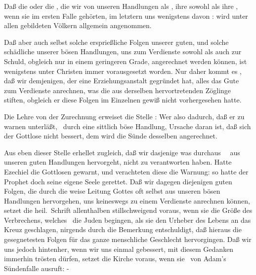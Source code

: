 \begin{aufza}
\item Daß die  oder die , die wir von unseren Handlungen als , ihre  sowohl als ihre , wenn sie im ersten Falle  gehörten, im letztern uns wenigstens davon : wird unter allen gebildeten Völkern allgemein angenommen.
\item Daß aber auch selbst solche ersprießliche Folgen unserer guten, und solche schädliche unserer bösen Handlungen,  uns zum Verdienste sowohl als auch zur Schuld, obgleich nur in einem geringeren Grade, angerechnet werden können, ist wenigstens unter Christen immer vorausgesetzt worden. Nur daher kommt es \zB , daß wir demjenigen, der eine Erziehungsanstalt gegründet hat, alles das Gute zum Verdienste anrechnen, was die aus derselben hervortretenden Zöglinge stiften, obgleich er diese Folgen im Einzelnen gewiß nicht vorhergesehen hatte.
\item Die Lehre von der Zurechnung  erweiset die Stelle :  Wer also dadurch, daß er zu warnen unterläßt, \dh\ durch eine sittlich böse Handlung, Ursache daran ist, daß sich der Gottlose nicht bessert, dem wird die Sünde desselben angerechnet.
\item Aus eben dieser Stelle erhellet zugleich, daß wir dasjenige  was durchaus ~\ aus unseren guten Handlungen hervorgeht, nicht zu verantworten haben. Hatte Ezechiel die Gottlosen gewarnt, und verachteten diese die Warnung: so hatte der Prophet doch seine eigene Seele gerettet. Daß wir dagegen diejenigen guten Folgen, die durch die weise Leitung Gottes oft selbst aus unseren bösen Handlungen hervorgehen, uns keineswegs zu einem Verdienste anrechnen können, setzet die heil.\ Schrift allenthalben stillschweigend voraus, wenn sie die Größe des Verbrechens, welches \zB\ die Juden begingen, als sie den Urheber des Lebens an das Kreuz geschlagen, nirgends durch die Bemerkung entschuldigt, daß hieraus die gesegnetesten Folgen für das ganze menschliche Geschlecht hervorgingen. Daß wir uns jedoch hintenher, wenn wir uns einmal gebessert, mit diesem Gedanken immerhin trösten dürfen, setzet die Kirche voraus, wenn sie \zB\ von Adam's Sündenfalle ausruft:  -

\end{aufza}

